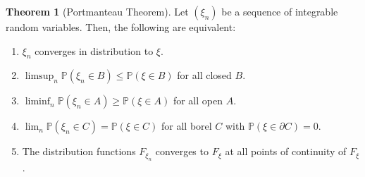 \documentclass[]{article}
\theoremstyle{definition}
\newtheorem{theorem}{Theorem}
\theoremstyle{definition}
\begin{document}
\begin{theorem}[Portmanteau Theorem]
  Let \((\xi_n)\) be a sequence of integrable random variables. Then, the 
  following are equivalent:
  \begin{enumerate}
    \item \(\xi_n\) converges in distribution to \(\xi\).
    \item \(\limsup_n \mathbb{P}(\xi_n \in B) \le \mathbb{P}(\xi \in B)\) for all closed \(B\).
    \item \(\liminf_n \mathbb{P}(\xi_n \in A) \ge \mathbb{P}(\xi \in A)\) for all open \(A\).
    \item \(\lim_n \mathbb{P}(\xi_n \in C) = \mathbb{P}(\xi \in C)\) for all borel \(C\) with 
      \(\mathbb{P}(\xi \in \partial C) = 0\).
    \item The distribution functions \(F_{\xi_n}\) converges to \(F_\xi\) at all 
      points of continuity of \(F_\xi\).
  \end{enumerate}
\end{theorem}
\end{document}
